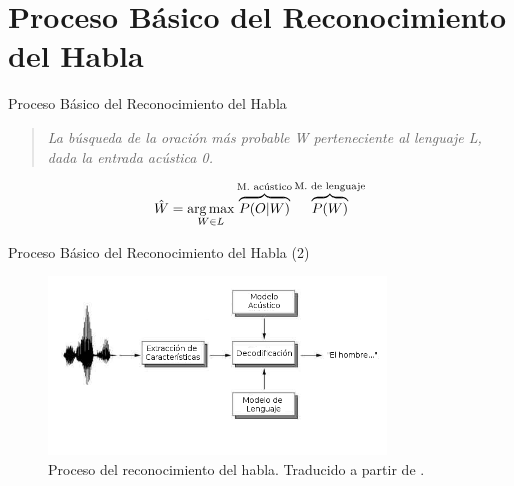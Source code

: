 \section{Proceso B\'asico del Reconocimiento del Habla}

\begin{frame}{Proceso B\'asico del Reconocimiento del Habla}

\begin{quote}
\emph{La b\'usqueda de la oraci\'on m\'as probable W perteneciente al lenguaje L, dada la entrada ac\'ustica 0.}
\end{quote}

\begin{align}
\hat{W} = \operatorname*{arg\,max}_{W \in L} \overbrace{P(O|W)}^\text{M. ac\'ustico}\overbrace{P(W)}^\text{M. de lenguaje}
\label{eq:asrFundamental}
\end{align}
\end{frame}

\begin{frame}{Proceso B\'asico del Reconocimiento del Habla (2)}

\begin{figure}[H] 
\centering
\includegraphics[width=0.8\textwidth]{./graphics/proceso.png}
\caption{Proceso del reconocimiento del habla. Traducido a partir de \protect\cite{VerenichASR}.}
\label{figure:proceso}
\end{figure}
\end{frame}

